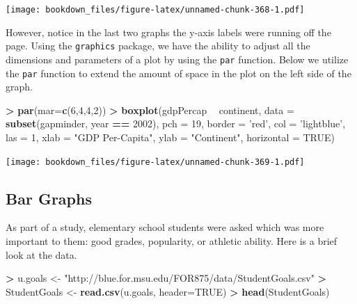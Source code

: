 \documentclass[]{krantz}
\makeatletter
\newenvironment{Shaded}{\begin{snugshade}}{\end{snugshade}}
\newcommand{\KeywordTok}[1]{\textcolor[rgb]{0.27,0.27,0.27}{\textbf{#1}}}
\newcommand{\DataTypeTok}[1]{\textcolor[rgb]{0.27,0.27,0.27}{#1}}
\newcommand{\DecValTok}[1]{\textcolor[rgb]{0.06,0.06,0.06}{#1}}
\newcommand{\StringTok}[1]{\textcolor[rgb]{0.5,0.5,0.5}{#1}}
\newcommand{\OtherTok}[1]{\textcolor[rgb]{0.37,0.37,0.37}{#1}}
\newcommand{\OperatorTok}[1]{\textcolor[rgb]{0.43,0.43,0.43}{\textbf{#1}}}
\newcommand{\NormalTok}[1]{#1}
\newenvironment{kframe}{%
\medskip{}
\setlength{\fboxsep}{.8em}
 \def\at@end@of@kframe{}%
 \ifinner\ifhmode%
  \def\at@end@of@kframe{\end{minipage}}%
  \begin{minipage}{\columnwidth}%
 \fi\fi%
 \def\FrameCommand##1{\hskip\@totalleftmargin \hskip-\fboxsep
 \colorbox{shadecolor}{##1}\hskip-\fboxsep
     \hskip-\linewidth \hskip-\@totalleftmargin \hskip\columnwidth}%
 \MakeFramed {\advance\hsize-\width
   \@totalleftmargin\z@ \linewidth\hsize
   \@setminipage}}%
 {\par\unskip\endMakeFramed%
 \at@end@of@kframe}
\renewenvironment{Shaded}{\begin{kframe}}{\end{kframe}}
\makeatother
\begin{document}
\texttt{[image: bookdown\_files/figure-latex/unnamed-chunk-368-1.pdf]}

However, notice in the last two graphs the y-axis labels were running
off the page. Using the \texttt{graphics} package, we have the ability
to adjust all the dimensions and parameters of a plot by using the
\texttt{par} function. Below we utilize the \texttt{par} function to
extend the amount of space in the plot on the left side of the graph.

\begin{Shaded}
\begin{Highlighting}[]
\OperatorTok{>}\StringTok{ }\KeywordTok{par}\NormalTok{(}\DataTypeTok{mar=}\KeywordTok{c}\NormalTok{(}\DecValTok{6}\NormalTok{,}\DecValTok{4}\NormalTok{,}\DecValTok{4}\NormalTok{,}\DecValTok{2}\NormalTok{))}
\OperatorTok{>}\StringTok{ }\KeywordTok{boxplot}\NormalTok{(gdpPercap }\OperatorTok{~}\StringTok{ }\NormalTok{continent, }\DataTypeTok{data =} \KeywordTok{subset}\NormalTok{(gapminder, year }\OperatorTok{==}\StringTok{ }\DecValTok{2002}\NormalTok{), }\DataTypeTok{pch =} \DecValTok{19}\NormalTok{, }\DataTypeTok{border =} \StringTok{'red'}\NormalTok{, }\DataTypeTok{col =} \StringTok{'lightblue'}\NormalTok{, }\DataTypeTok{las =} \DecValTok{1}\NormalTok{, }\DataTypeTok{xlab =} \StringTok{"GDP Per-Capita"}\NormalTok{, }\DataTypeTok{ylab =} \StringTok{"Continent"}\NormalTok{, }\DataTypeTok{horizontal =} \OtherTok{TRUE}\NormalTok{)}
\end{Highlighting}
\end{Shaded}

\texttt{[image: bookdown\_files/figure-latex/unnamed-chunk-369-1.pdf]}

\subsection{Bar Graphs}\label{bar-graphs-1}

As part of a study, elementary school students were asked which was more
important to them: good grades, popularity, or athletic ability. Here is
a brief look at the data.

\begin{Shaded}
\begin{Highlighting}[]
\OperatorTok{>}\StringTok{ }\NormalTok{u.goals <-}\StringTok{ "http://blue.for.msu.edu/FOR875/data/StudentGoals.csv"}
\OperatorTok{>}\StringTok{ }\NormalTok{StudentGoals <-}\StringTok{ }\KeywordTok{read.csv}\NormalTok{(u.goals, }\DataTypeTok{header=}\OtherTok{TRUE}\NormalTok{)}
\OperatorTok{>}\StringTok{ }\KeywordTok{head}\NormalTok{(StudentGoals)}
\end{Highlighting}
\end{Shaded}
\end{document}
